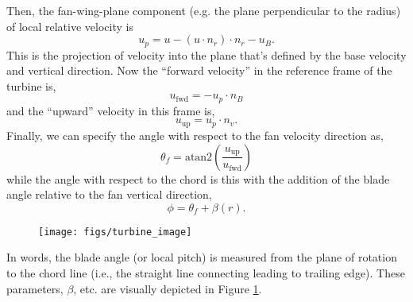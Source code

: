 

Then, the fan-wing-plane component (e.g. the plane perpendicular to the 
radius) of local relative velocity is
\begin{equation}
u_p = u - (u\cdot n_r)\cdot n_r - u_B. 
\end{equation}
This is the projection of velocity into the plane that's defined by the
base velocity and vertical direction. 
Now the ``forward velocity'' in the reference frame of the turbine is, 
\begin{equation}
u_{\text{fwd}}= -u_p \cdot n_B
\end{equation}
and the ``upward'' velocity in this frame is, 
\begin{equation}
u_{\text{up}} = u_p \cdot n_v. 
\end{equation}
Finally, we can specify the angle with respect to the fan velocity
direction as, 
\begin{equation}
 \theta_f = \text{atan2}\left(\frac{u_{\text{up}}}{u_{\text{fwd}}}\right)
\end{equation}
while the angle with respect to the chord is this with the addition of
the blade angle relative to the fan vertical direction, 
\begin{equation}
 \phi = \theta_f + \beta(r).
\end{equation}

  \begin{figure}[!htb]
    \begin{center}
     \texttt{[image: figs/turbine\_image]}
     \caption{}
     \label{fig:turbine_image}
    \end{center}
  \end{figure}

In words, the blade angle (or local pitch) is measured from the plane of
rotation to the chord line (i.e., the straight line connecting leading
to trailing edge). These parameters, $\beta$, etc. are visually depicted
in Figure \ref{fig:turbine_image}.  



